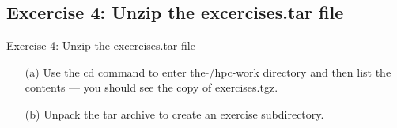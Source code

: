 \subsection{Excercise 4: Unzip the excercises.tar file}
\begin{frame}{Exercise 4: Unzip the excercises.tar file}
  \begin{itemize}

\item[(a)]{Use the \alert{cd} command to enter the $\tilde{}$/hpc-work directory and then list the contents --- you should see the copy of exercises.tgz.}

\item[(b)]{Unpack the tar archive to create an exercise subdirectory.}
\end{itemize}
\end{frame}


